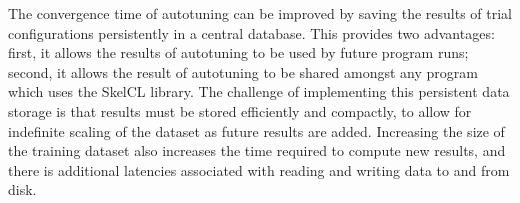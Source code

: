
The convergence time of autotuning can be improved by saving the
results of trial configurations persistently in a central
database. This provides two advantages: first, it allows the results
of autotuning to be used by future program runs; second, it allows the
result of autotuning to be shared amongst any program which uses the
SkelCL library. The challenge of implementing this persistent data
storage is that results must be stored efficiently and compactly, to
allow for indefinite scaling of the dataset as future results are
added. Increasing the size of the training dataset also increases the
time required to compute new results, and there is additional
latencies associated with reading and writing data to and from disk.
